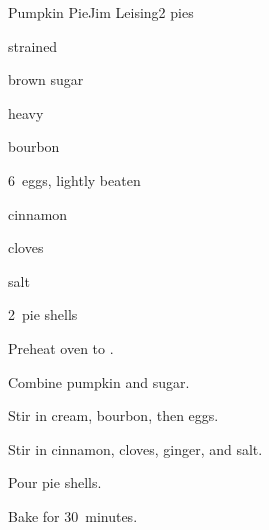 \begin{recipe}{Pumpkin Pie}{Jim Leising}{2 pies}

\begin{ingredients}
\item \C{1\threequarter} strained 
\item {} brown sugar
\item \C{1\half} heavy 
\item \C{\half} bourbon
\item 6~eggs, lightly beaten
\item {} cinnamon
\item \tp{\half} cloves
\item \tp{1\half} 
\item \tp{\quarter} salt
\item 2~pie shells
\end{ingredients}

\begin{directions}
\item Preheat oven to .
\item Combine pumpkin and sugar.
\item Stir in cream, bourbon, then eggs.
\item Stir in cinnamon, cloves, ginger, and salt.
\item Pour pie shells.
\item Bake for 30~minutes.
\end{directions}

\end{recipe}
